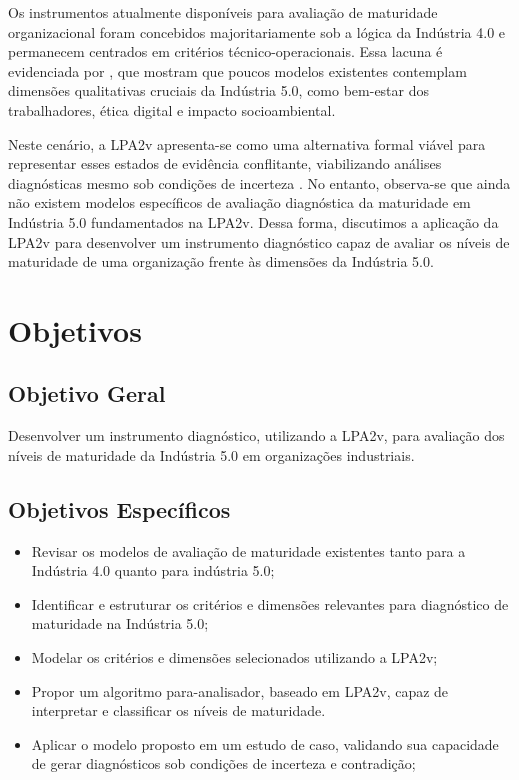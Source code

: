 Os instrumentos atualmente disponíveis para avaliação de maturidade organizacional foram concebidos majoritariamente sob a lógica da Indústria 4.0 e permanecem centrados em critérios técnico-operacionais.
Essa lacuna é evidenciada por , que mostram que poucos modelos existentes contemplam dimensões qualitativas cruciais da Indústria 5.0, como bem-estar dos trabalhadores, ética digital e impacto socioambiental.

Neste cenário, a \gls{LPA2v} apresenta-se como uma alternativa formal viável para representar esses estados de evidência conflitante, viabilizando análises diagnósticas mesmo sob condições de incerteza \cite{JoseSilvaFilho2006, CarvalhoBrunsteinAbe2003, CarvalhoJunior2024}.
No entanto, observa-se que ainda não existem modelos específicos de avaliação diagnóstica da maturidade em Indústria 5.0 fundamentados na \gls{LPA2v}.
Dessa forma, discutimos a aplicação da \gls{LPA2v} para desenvolver um instrumento diagnóstico capaz de avaliar os níveis de maturidade de uma organização frente às dimensões da Indústria 5.0.

\section{Objetivos}

\subsection{Objetivo Geral}

Desenvolver um instrumento diagnóstico, utilizando a \gls{LPA2v}, para avaliação dos níveis de maturidade da Indústria 5.0 em organizações industriais.

\subsection{Objetivos Específicos}

\begin{itemize}
  \item Revisar os modelos de avaliação de maturidade existentes tanto para a Indústria 4.0 quanto para indústria 5.0;
  \item Identificar e estruturar os critérios e dimensões relevantes para diagnóstico de maturidade na Indústria 5.0;
  \item Modelar os critérios e dimensões selecionados utilizando a \gls{LPA2v};
  \item Propor um algoritmo para-analisador, baseado em \gls{LPA2v}, capaz de interpretar e classificar os níveis de maturidade.
  \item Aplicar o modelo proposto em um estudo de caso, validando sua capacidade de gerar diagnósticos sob condições de incerteza e contradição;
\end{itemize}


